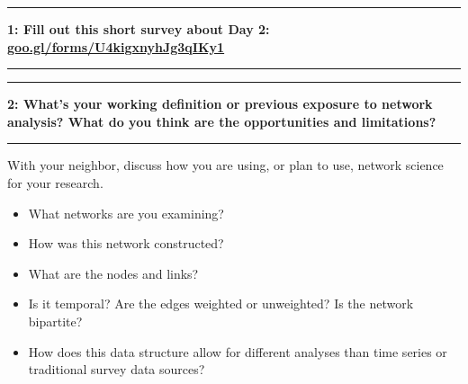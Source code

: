 \documentclass[11pt]{article}
\newcommand\question[2]{\vspace{.25in}\hrule\textbf{#1: #2}\vspace{.5em}\hrule\vspace{.10in}}
\begin{document}
\raggedright
\newcommand\NAME{Allie Morgan} 

\vspace{-0.2 in}
\question{1}{Fill out this short survey about Day 2: \href{https://goo.gl/forms/U4kigxnyhJg3qIKy1}{goo.gl/forms/U4kigxnyhJg3qIKy1}} 
\vspace{1 in}

\question{2}{What's your working definition or previous exposure to network analysis? What do you think are the opportunities and limitations?}
With your neighbor, discuss how you are using, or plan to use, network science for your research.
\begin{itemize}
\item What networks are you examining? 
\item How was this network constructed? 
\item What are the nodes and links? 
\item Is it temporal? Are the edges weighted or unweighted? Is the network bipartite? 
\item How does this data structure allow for different analyses than time series or traditional survey data sources?
\end{itemize}
\end{document}
